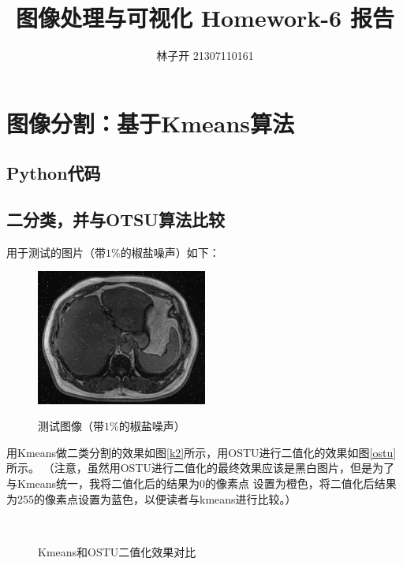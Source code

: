 \documentclass{article}
\title{图像处理与可视化 Homework-6 报告}
\author{林子开 21307110161}
\begin{document}
	\maketitle
	\tableofcontents

\section{图像分割：基于Kmeans算法}
\subsection{Python代码}
 
\subsection{二分类，并与OTSU算法比较}
用于测试的图片（带$1\%$的椒盐噪声）如下：
\begin{figure}[H]
	\centering
	{\includegraphics[width=0.5\textwidth]{受到椒盐噪声污染的肝脏图像.png}} 
	\caption{测试图像（带$1\%$的椒盐噪声）}
\end{figure}
用Kmeans做二类分割的效果如图\ref{k2}所示，用OSTU进行二值化的效果如图\ref{ostu}所示。
（注意，虽然用OSTU进行二值化的最终效果应该是黑白图片，但是为了与Kmeans统一，我将二值化后的结果为0的像素点
设置为橙色，将二值化后结果为255的像素点设置为蓝色，以便读者与kmeans进行比较。）
\begin{figure}[H]
    \centering
    \,    
    \caption{Kmeans和OSTU二值化效果对比}\label{} 
\end{figure}
\end{document}

